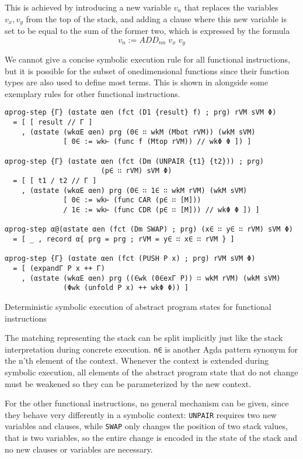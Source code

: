 This is achieved by introducing a new variable $v_n$ that replaces the
variables $v_x, v_y$ from the top of the stack,
and adding a clause where this new variable is set to be equal to the sum of the former two,
which is expressed by the formula
\[	v_n := ADD_{nn}\; v_x\; v_y
\]

We cannot give a concise symbolic execution rule for all functional instructions,
but it is possible for the subset of onedimensional functions since their
function types are also used to define most terms.
This is shown in  alongside some exemplary rules for other functional
instructions.

\begin{listing}[!ht]
\begin{verbatim}
αprog-step {Γ} (αstate αen (fct (D1 {result} f) ; prg) rVM sVM Φ)
  = [ [ result // Γ ]
    , (αstate (wkαE αen) prg (0∈ ∷ wkM (Mbot rVM)) (wkM sVM)
              [ 0∈ := wk⊢ (func f (Mtop rVM)) // wkΦ Φ ]) ]

αprog-step {Γ} (αstate αen (fct (Dm (UNPAIR {t1} {t2})) ; prg)
                       (p∈ ∷ rVM) sVM Φ)
  = [ [ t1 / t2 // Γ ]
    , (αstate (wkαE αen) prg (0∈ ∷ 1∈ ∷ wkM rVM) (wkM sVM)
              [ 0∈ := wk⊢ (func CAR (p∈ ∷ [M]))
              / 1∈ := wk⊢ (func CDR (p∈ ∷ [M])) // wkΦ Φ ]) ]

αprog-step α@(αstate αen (fct (Dm SWAP) ; prg) (x∈ ∷ y∈ ∷ rVM) sVM Φ)
  = [ _ , record α{ prg = prg ; rVM = y∈ ∷ x∈ ∷ rVM } ]

αprog-step {Γ} (αstate αen (fct (PUSH P x) ; prg) rVM sVM Φ)
  = [ (expandΓ P x ++ Γ)
    , (αstate (wkαE αen) prg ((∈wk (0∈exΓ P)) ∷ wkM rVM) (wkM sVM)
              (Φwk (unfold P x) ++ wkΦ Φ)) ]
\end{verbatim}
\caption{Deterministic symbolic execution of abstract program states for functional instructions}
\label{aprog-step-func}
\end{listing}

The matching representing the stack can be split implicitly
just like the stack interpretation during concrete execution.
\verb/n∈/ is another Agda pattern synonym for the n'th element of the context.
Whenever the context is extended during symbolic execution, all elements of the abstract
program state that do not change must be weakened so they can be parameterized by the new context.

For the other functional instructions, no general mechanism can be given,
since they behave very differently in a symbolic context:
\verb/UNPAIR/ requires two new variables and clauses, while
\verb/SWAP/ only changes the position of two stack values, that is two variables,
so the entire change is encoded in the state of the stack
and no new clauses or variables are necessary.

